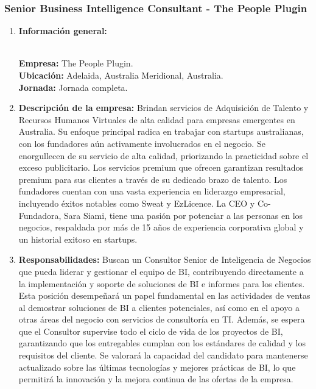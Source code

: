 \documentclass[12pt]{article}
\begin{document}
            \subsubsection{Senior Business Intelligence Consultant - The People Plugin}
                \begin{enumerate}
                    \item \textbf{Información general:}
                    
                        \textbf{\\Empresa:} The People Plugin.
                        \textbf{\\Ubicación:} Adelaida, Australia Meridional, Australia.
                        \textbf{\\Jornada:} Jornada completa.

                    \item \textbf{Descripción de la empresa:}
                        Brindan servicios de Adquisición de Talento y Recursos Humanos Virtuales de alta calidad para empresas emergentes en Australia. Su enfoque principal radica en trabajar con startups australianas, con los fundadores aún activamente involucrados en el negocio. Se enorgullecen de su servicio de alta calidad, priorizando la practicidad sobre el exceso publicitario. Los servicios premium que ofrecen garantizan resultados premium para sus clientes a través de su dedicado brazo de talento. Los fundadores cuentan con una vasta experiencia en liderazgo empresarial, incluyendo éxitos notables como Sweat y EzLicence. La CEO y Co-Fundadora, Sara Siami, tiene una pasión por potenciar a las personas en los negocios, respaldada por más de 15 años de experiencia corporativa global y un historial exitoso en startups.

                    \item \textbf{Responsabilidades:}
                        Buscan un Consultor Senior de Inteligencia de Negocios que pueda liderar y gestionar el equipo de BI, contribuyendo directamente a la implementación y soporte de soluciones de BI e informes para los clientes. Esta posición desempeñará un papel fundamental en las actividades de ventas al demostrar soluciones de BI a clientes potenciales, así como en el apoyo a otras áreas del negocio con servicios de consultoría en TI. Además, se espera que el Consultor supervise todo el ciclo de vida de los proyectos de BI, garantizando que los entregables cumplan con los estándares de calidad y los requisitos del cliente. Se valorará la capacidad del candidato para mantenerse actualizado sobre las últimas tecnologías y mejores prácticas de BI, lo que permitirá la innovación y la mejora continua de las ofertas de la empresa.


\end{enumerate}
\end{document}
